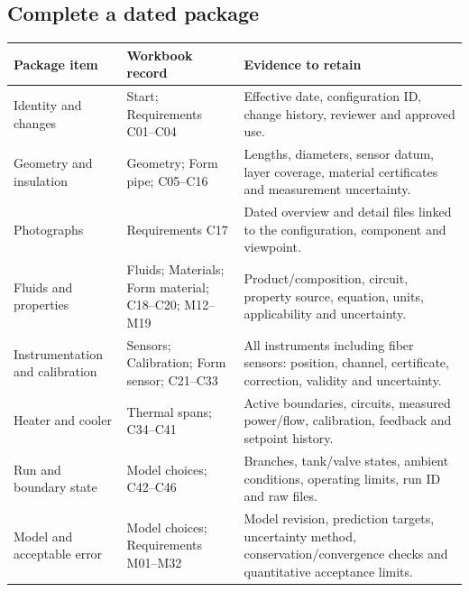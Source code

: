 \documentclass[11pt]{article}
\begin{document}
\subsection*{Complete a dated package}
\small\setlength{\tabcolsep}{4pt}
\begin{longtable}{p{}p{}p{}}
\toprule
\textbf{Package item} & \textbf{Workbook record} & \textbf{Evidence to retain} \\\midrule\endhead
Identity and changes & Start; Requirements C01--C04 & Effective date, configuration ID, change history, reviewer and approved use. \\[3pt]
Geometry and insulation & Geometry; Form pipe; C05--C16 & Lengths, diameters, sensor datum, layer coverage, material certificates and measurement uncertainty. \\[3pt]
Photographs & Requirements C17 & Dated overview and detail files linked to the configuration, component and viewpoint. \\[3pt]
Fluids and properties & Fluids; Materials; Form material; C18--C20; M12--M19 & Product/composition, circuit, property source, equation, units, applicability and uncertainty. \\[3pt]
Instrumentation and calibration & Sensors; Calibration; Form sensor; C21--C33 & All instruments including fiber sensors: position, channel, certificate, correction, validity and uncertainty. \\[3pt]
Heater and cooler & Thermal spans; C34--C41 & Active boundaries, circuits, measured power/flow, calibration, feedback and setpoint history. \\[3pt]
Run and boundary state & Model choices; C42--C46 & Branches, tank/valve states, ambient conditions, operating limits, run ID and raw files. \\[3pt]
Model and acceptable error & Model choices; Requirements M01--M32 & Model revision, prediction targets, uncertainty method, conservation/convergence checks and quantitative acceptance limits. \\[3pt]
\bottomrule\end{longtable}\normalsize
\end{document}
